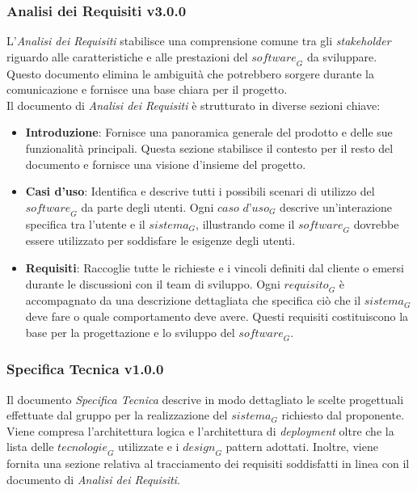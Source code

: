 \subsubsection{Analisi dei Requisiti v3.0.0}
L'\textit{Analisi dei Requisiti} stabilisce una comprensione comune tra gli \textit{stakeholder} riguardo alle caratteristiche e alle prestazioni del $\textit{software}_G$ da sviluppare. Questo documento elimina le ambiguità che potrebbero sorgere durante la comunicazione e fornisce una base chiara per il progetto.
\\
Il documento di \textit{Analisi dei Requisiti} è strutturato in diverse sezioni chiave:
\begin{itemize}
\item \textbf{Introduzione}: Fornisce una panoramica generale del prodotto e delle sue funzionalità principali. Questa sezione stabilisce il contesto per il resto del documento e fornisce una visione d'insieme del progetto.

\item \textbf{Casi d'uso}: Identifica e descrive tutti i possibili scenari di utilizzo del $\textit{software}_G$ da parte degli utenti. Ogni $\textit{caso d'uso}_G$ descrive un'interazione specifica tra l'utente e il $\textit{sistema}_G$, illustrando come il $\textit{software}_G$ dovrebbe essere utilizzato per soddisfare le esigenze degli utenti.

\item \textbf{Requisiti}: Raccoglie tutte le richieste e i vincoli definiti dal cliente o emersi durante le discussioni con il team di sviluppo. Ogni $\textit{requisito}_G$ è accompagnato da una descrizione dettagliata che specifica ciò che il $\textit{sistema}_G$ deve fare o quale comportamento deve avere. Questi requisiti costituiscono la base per la progettazione e lo sviluppo del $\textit{software}_G$.
\end{itemize}

\subsubsection{Specifica Tecnica v1.0.0}
Il documento \textit{Specifica Tecnica} descrive in modo dettagliato le scelte progettuali effettuate dal gruppo per la realizzazione del $\textit{sistema}_G$ richiesto dal proponente. 
\\Viene compresa l’architettura logica e l’architettura di \textit{deployment} oltre che la lista
delle $\textit{tecnologie}_G$ utilizzate e i $\textit{design}_G$ pattern adottati.
Inoltre, viene fornita una sezione relativa al tracciamento dei requisiti soddisfatti in linea con il documento di \textit{Analisi dei Requisiti}.

